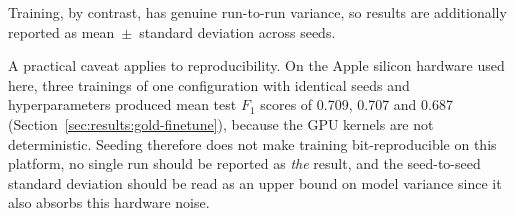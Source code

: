Training, by contrast, has genuine run-to-run variance, so results are additionally reported as mean~$\pm$~standard deviation across seeds.

A practical caveat applies to reproducibility. On the Apple silicon hardware used here, three trainings of one configuration with identical seeds and hyperparameters produced mean test $F_1$ scores of 0.709, 0.707 and 0.687 (Section~\ref{sec:results:gold-finetune}), because the GPU kernels are not deterministic. Seeding therefore does not make training bit-reproducible on this platform, no single run should be reported as \emph{the} result, and the seed-to-seed standard deviation should be read as an upper bound on model variance since it also absorbs this hardware noise.
